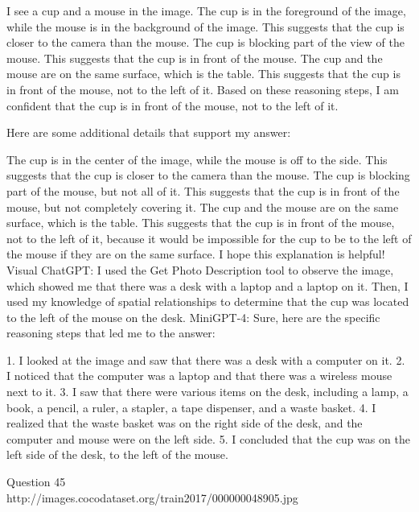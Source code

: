 \begin{enumerate}
    I see a cup and a mouse in the image.
    The cup is in the foreground of the image, while the mouse is in the background of the image. This suggests that the cup is closer to the camera than the mouse.
    The cup is blocking part of the view of the mouse. This suggests that the cup is in front of the mouse.
    The cup and the mouse are on the same surface, which is the table. This suggests that the cup is in front of the mouse, not to the left of it.
    Based on these reasoning steps, I am confident that the cup is in front of the mouse, not to the left of it.

    Here are some additional details that support my answer:

    The cup is in the center of the image, while the mouse is off to the side. This suggests that the cup is closer to the camera than the mouse.
    The cup is blocking part of the mouse, but not all of it. This suggests that the cup is in front of the mouse, but not completely covering it.
    The cup and the mouse are on the same surface, which is the table. This suggests that the cup is in front of the mouse, not to the left of it, because it would be impossible for the cup to be to the left of the mouse if they are on the same surface.
    I hope this explanation is helpful!
    \subitem Visual ChatGPT: I used the Get Photo Description tool to observe the image, which showed me that there was a desk with a laptop and a laptop on it. Then, I used my knowledge of spatial relationships to determine that the cup was located to the left of the mouse on the desk.
    \subitem MiniGPT-4: Sure, here are the specific reasoning steps that led me to the answer:

    1. I looked at the image and saw that there was a desk with a computer on it.
    2. I noticed that the computer was a laptop and that there was a wireless mouse next to it.
    3. I saw that there were various items on the desk, including a lamp, a book, a pencil, a ruler, a stapler, a tape dispenser, and a waste basket.
    4. I realized that the waste basket was on the right side of the desk, and the computer and mouse were on the left side.
    5. I concluded that the cup was on the left side of the desk, to the left of the mouse.
\end{enumerate}
Question 45\\
http://images.cocodataset.org/train2017/000000048905.jpg
